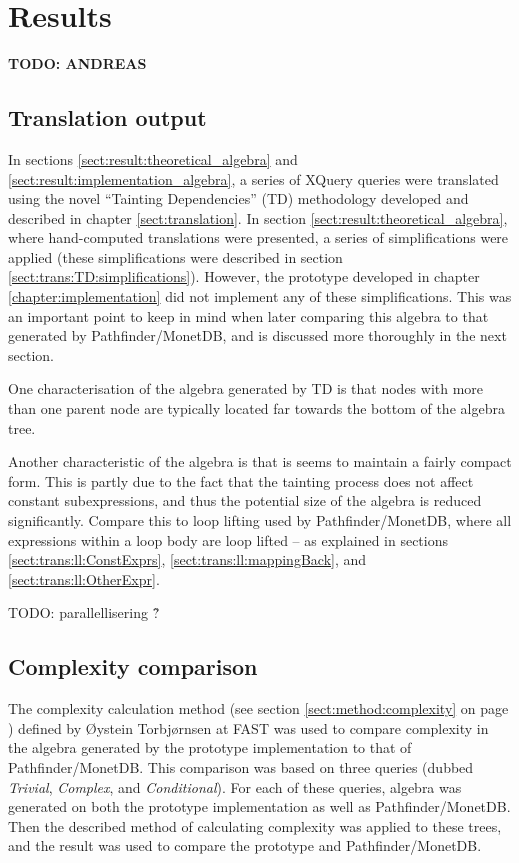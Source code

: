 \section{Results}
\label{sect:disc:res}
\textbf{\LARGE TODO: {{ANDREAS}}}

\subsection{Translation output}
\label{sect:disc:res:translation_output}
In sections \ref{sect:result:theoretical_algebra} and
\ref{sect:result:implementation_algebra}, a series of XQuery queries were
translated using the novel ``Tainting Dependencies'' (TD) methodology developed
and described in chapter \ref{sect:translation}. In section
\ref{sect:result:theoretical_algebra}, where hand-computed translations were
presented, a series of simplifications were applied (these simplifications were
described in section \ref{sect:trans:TD:simplifications}). However, the
prototype developed in chapter \ref{chapter:implementation} did not implement
any of these simplifications. This was an important point to keep in mind when
later comparing this algebra to that generated by Pathfinder/MonetDB, and is
discussed more thoroughly in the next section.

One characterisation of the algebra generated by TD is that nodes with more
than one parent node are typically located far towards the bottom of the algebra
tree. 

Another characteristic of the algebra is that is seems to maintain a fairly
compact form. This is partly due to the fact that the tainting process does not
affect constant subexpressions, and thus the potential size of the algebra is
reduced significantly. Compare this to loop lifting used by
Pathfinder/MonetDB, where all expressions within a loop body are loop lifted --
as explained in sections \ref{sect:trans:ll:ConstExprs},
\ref{sect:trans:ll:mappingBack}, and \ref{sect:trans:ll:OtherExpr}.

TODO: parallellisering \^ ?

\subsection{Complexity comparison}
\label{sect:disc:res:comparison}
The complexity calculation method (see section \ref{sect:method:complexity} on
page \pageref{sect:method:complexity}) defined by \O ystein Torbj\o rnsen at
FAST was used to compare complexity in the algebra generated by the prototype
implementation to that of Pathfinder/MonetDB. This comparison was
based on three queries (dubbed \emph{Trivial}, \emph{Complex}, and
\emph{Conditional}). For each of these queries, algebra was generated on both
the prototype implementation as well as Pathfinder/MonetDB. Then the described
method of calculating complexity was applied to these trees, and the result was
used to compare the prototype and Pathfinder/MonetDB.

